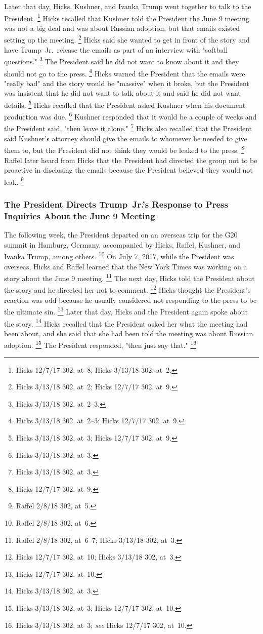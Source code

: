{Later that day, Hicks, Kushner, and Ivanka Trump went together to talk to the President.%
\footnote{Hicks 12/7/17 302, at~8;
Hicks 3/13/18 302, at~2.}
Hicks recalled that Kushner told the President the June 9 meeting was not a big deal and was about Russian adoption, but that emails existed setting up the meeting.%
\footnote{Hicks 3/13/18 302, at~2;
Hicks 12/7/17 302, at~9.}
Hicks said she wanted to get in front of the story and have Trump~Jr.\ release the emails as part of an interview with "softball questions."%
\footnote{Hicks 3/13/18 302, at~2--3.}
The President said he did not want to know about it and they should not go to the press.%
\footnote{Hicks 3/13/18 302, at~2--3;
Hicks 12/7/17 302, at~9.}
Hicks warned the President that the emails were "really bad" and the story would be "massive" when it broke, but the President was insistent that he did not want to talk about it and said he did not want details.%
\footnote{Hicks 3/13/18 302, at~3;
Hicks 12/7/17 302, at~9.}
Hicks recalled that the President asked Kushner when his document production was due.%
\footnote{Hicks 3/13/18 302, at~3.}
Kushner responded that it would be a couple of weeks and the President said, "then leave it alone."%
\footnote{Hicks 3/13/18 302, at~3.}
Hicks also recalled that the President said Kushner's attorney should give the emails to whomever he needed to give them to, but the President did not think they would be leaked to the press.%
\footnote{Hicks 12/7/17 302, at~9.}
Raffel later heard from Hicks that the President had directed the group not to be proactive in disclosing the emails because the President believed they would not leak.%
\footnote{Raffel 2/8/18 302, at~5.}

\subsubsection{The President Directs Trump~Jr.'s Response to Press Inquiries About the June 9 Meeting}

The following week, the President departed on an overseas trip for the G20 summit in Hamburg, Germany, accompanied by Hicks, Raffel, Kushner, and Ivanka Trump, among others.%
\footnote{Raffel 2/8/18 302, at~6.}
On July 7, 2017, while the President was overseas, Hicks and Raffel learned that the New York Times was working on a story about the June 9 meeting.%
\footnote{Raffel 2/8/18 302, at~6--7;
Hicks 3/13/18 302, at~3.}
The next day, Hicks told the President about the story and he directed her not to comment.%
\footnote{Hicks 12/7/17 302, at~10;
Hicks 3/13/18 302, at~3.}
Hicks thought the President's reaction was odd because he usually considered not responding to the press to be the ultimate sin.%
\footnote{Hicks 12/7/17 302, at~10.}
Later that day, Hicks and the President again spoke about the story.%
\footnote{Hicks 3/13/18 302, at~3.}
Hicks recalled that the President asked her what the meeting had been about, and she said that she had been told the meeting was about Russian adoption.%
\footnote{Hicks 3/13/18 302, at~3;
Hicks 12/7/17 302, at~10.}
The President responded, "then just say that."%
\footnote{Hicks 3/13/18 302, at~3;
\textit{see} Hicks 12/7/17 302, at~10.}

}
